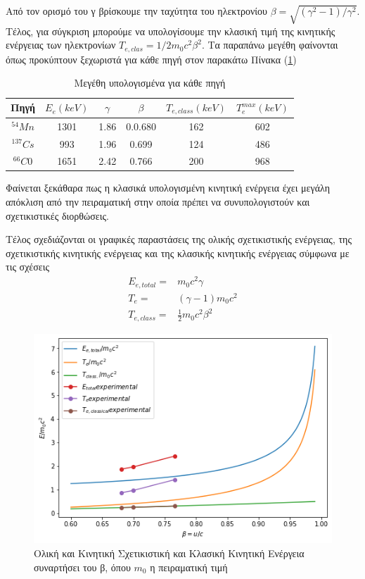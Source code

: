 \documentclass[a4paper]{article}
\begin{document}
	Από τον ορισμό του γ βρίσκουμε την ταχύτητα του ηλεκτρονίου $\beta = \sqrt{(\gamma^2-1)/\gamma^2}$.
	Τέλος, για σύγκριση μπορούμε να υπολογίσουμε την κλασική τιμή της κινητικής ενέργειας των ηλεκτρονίων $T_{e,clas} = 1/2 m_0 c^2\beta^2$. 
	Τα παραπάνω μεγέθη φαίνονται όπως προκύπτουν ξεχωριστά για κάθε πηγή στον παρακάτω Πίνακα (\ref{mat3}) 
	\begin{table}[h!]
		\centering 
		\begin{tabular}{c|c|c|c|c||c}
				  Πηγή & $E_e(keV)$  & $\gamma$ & $\beta$ & $T_{e,class}(keV)$ & $T_e^{max}(keV)$\\\hline
			$^{54}Mn $ & 1301        &   1.86  &   0.0.680& 162 &602\\
			$^{137}Cs$ & 993		    &   1.96  &    0.699 & 124 &486\\
 			$^{66}C0 $ & 1651        &  2.42  &    0.766 & 200 & 968
		\end{tabular}
		\caption{Μεγέθη υπολογισμένα για κάθε πηγή }
		\label{mat3}
	\end{table}
	Φαίνεται ξεκάθαρα πως η κλασικά υπολογισμένη κινητική ενέργεια έχει μεγάλη απόκλιση από την πειραματική στην οποία πρέπει να συνυπολογιστούν και σχετικιστικές διορθώσεις. 
	
	Τέλος σχεδιάζονται οι γραφικές παραστάσεις της ολικής σχετικιστικής ενέργειας, της σχετικιστικής κινητικής ενέργειας και της κλασικής κινητικής ενέργειας σύμφωνα με τις σχέσεις 
	\begin{align*}
		 E_{e,total} =& m_0 c^2 \gamma \\
		 T_{e}   =& (\gamma-1)m_0c^2 \\
		 T_{e,class} =& \frac{1}{2}m_0c^2 \beta^2
	\end{align*}
	
	\begin{figure}[h!]
		\centering
		\includegraphics[scale=0.7]{energy_plots}
		\caption{Ολική και Κινητική Σχετικιστική και Κλασική Κινητική Ενέργεια συναρτήσει του β, όπου $m_0$ η πειραματική τιμή}
		\label{fig3}
	\end{figure}
	
\end{document}
